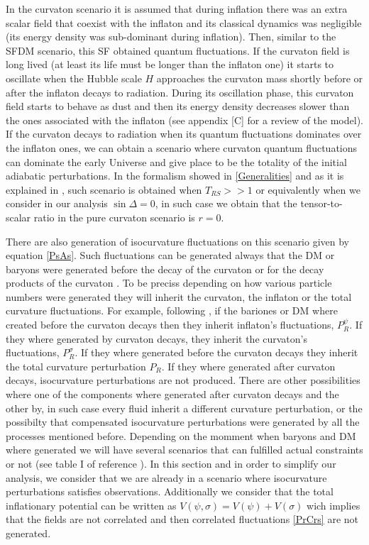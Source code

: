 \documentclass[amssymb,twocolumn,prd,nofootinbib,showpacs]{revtex4-1}
\begin{document}
In the curvaton scenario it is assumed that during inflation there was an extra scalar field that coexist with the inflaton and its classical dynamics was negligible (its energy density was sub-dominant during inflation). Then, similar to the SFDM scenario, this SF obtained quantum fluctuations. If the curvaton field is long lived (at least its life must be longer than the inflaton one) it starts to oscillate when the Hubble scale $H$ approaches the curvaton mass shortly before or after the inflaton decays to radiation. During its oscillation phase, this curvaton field starts to behave as dust and then its energy density decreases slower than the ones associated with the inflaton (see appendix [C] for a review of the model). If the curvaton decays to radiation when its quantum fluctuations dominates over the inflaton ones, we can obtain a scenario where curvaton quantum fluctuations can dominate the early Universe and give place to be the totality of the initial adiabatic perturbations. In the formalism showed in \ref{Generalities} and as it is explained in \cite{twofields}, such scenario is obtained when $T_{RS}>>1$ or equivalently when we consider in our analysis $\sin\Delta = 0$, in such case we obtain that the tensor-to-scalar ratio in the pure curvaton scenario is $r=0$. 

There are also generation of isocurvature fluctuations on this scenario given by equation \eqref{PsAs}. Such fluctuations can be generated always that the DM or baryons were generated before the decay of the curvaton or for the decay products of the curvaton \cite{curvaton9,curvaton10,curvaton11}. To be preciss depending on how various particle numbers were generated they will inherit the curvaton, the inflaton or the total curvature fluctuations. For example, following \cite{curvaton12,curvaton13,curvaton14}, if the bariones or DM where created before the curvaton decays then they inherit inflaton's fluctuations, $P_R^\psi$. If they where generated by curvaton decays, they inherit the curvaton's fluctuations, $P_R^\sigma$. If they where generated before the curvaton decays they inherit the total curvature perturbation $P_R$. If they where generated after curvaton decays, isocurvature perturbations are not produced. There are other possibilities where one of the components where generated after curvaton decays and the other by, in such case every fluid inherit a different curvature perturbation, or the possibilty that compensated isocurvature perturbations \cite{curvaton14} were generated by all the processes mentioned before. Depending on the momment when baryons and DM where generated we will have several scenarios that can fulfilled actual constraints or not (see table I of reference \cite{curvaton14}). In this section and in order to simplify our analysis, we consider that we are already in a scenario where isocurvature perturbations satisfies observations. Additionally we consider that the total inflationary potential can be written as $V(\psi,\sigma)=V(\psi)+V(\sigma)$ wich implies that the fields are not correlated and then correlated fluctuations \eqref{PrCrs} are not generated. 
\end{document}
